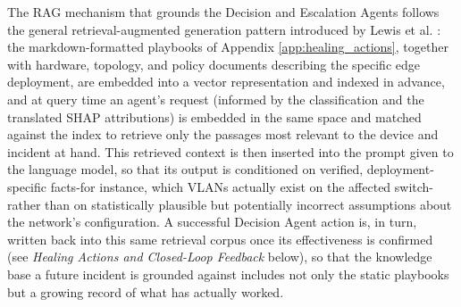 The RAG mechanism that grounds the Decision and Escalation Agents follows the general retrieval-augmented generation pattern introduced by Lewis et al. \cite{Lewis2020}: the markdown-formatted playbooks of Appendix \ref{app:healing_actions}, together with hardware, topology, and policy documents describing the specific edge deployment, are embedded into a vector representation and indexed in advance, and at query time an agent's request (informed by the classification and the translated SHAP attributions) is embedded in the same space and matched against the index to retrieve only the passages most relevant to the device and incident at hand. This retrieved context is then inserted into the prompt given to the language model, so that its output is conditioned on verified, deployment-specific facts-for instance, which VLANs actually exist on the affected switch-rather than on statistically plausible but potentially incorrect assumptions about the network's configuration. A successful Decision Agent action is, in turn, written back into this same retrieval corpus once its effectiveness is confirmed (see \textit{Healing Actions and Closed-Loop Feedback} below), so that the knowledge base a future incident is grounded against includes not only the static playbooks but a growing record of what has actually worked.

